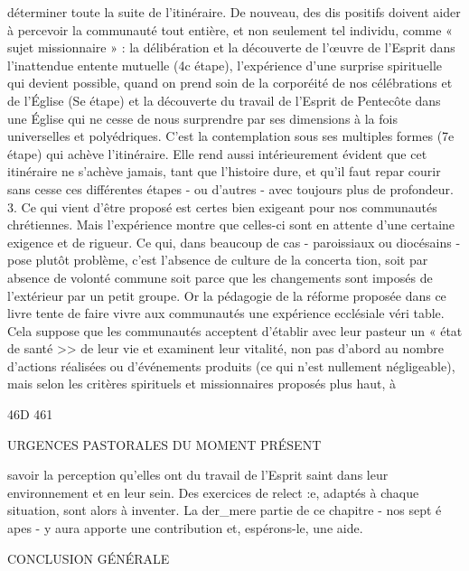{déterminer toute la suite de l'itinéraire. De nouveau, des dis­ positifs doivent aider à percevoir la communauté tout entière, et non seulement tel individu, comme « sujet missionnaire » : la délibération et la découverte de l'œuvre de l'Esprit dans l'inattendue entente mutuelle (4c étape), l'expérience d'une surprise spirituelle qui devient possible, quand on prend soin de la corporéité de nos célébrations et de l'Église (Se étape) et la découverte du travail de l'Esprit de Pentecôte dans une Église qui ne cesse de nous surprendre par ses dimensions à la fois universelles et polyédriques. C'est la contemplation sous ses multiples formes (7e étape) qui achève l'itinéraire. Elle rend aussi intérieurement évident que cet itinéraire ne s'achève jamais, tant que l'histoire dure, et qu'il faut repar­ courir sans cesse ces différentes étapes - ou d'autres - avec toujours plus de profondeur.
3.	Ce qui vient d'être proposé est certes bien exigeant pour nos communautés chrétiennes. Mais l'expérience montre que celles-ci sont en attente d'une certaine exigence et de rigueur. Ce qui, dans beaucoup de cas -	paroissiaux ou diocésains - pose plutôt problème, c'est l'absence de culture de la concerta­ tion, soit par absence de volonté commune soit parce que les changements sont imposés de l'extérieur par un petit groupe. Or la pédagogie de la réforme proposée dans ce livre tente de faire vivre aux communautés une expérience ecclésiale véri­ table. Cela suppose que les communautés acceptent d'établir avec leur pasteur un « état de santé >> de leur vie et examinent leur vitalité, non pas d'abord au nombre d'actions réalisées ou d'événements produits (ce qui n'est nullement négligeable), mais selon les critères spirituels et missionnaires proposés plus haut, à
 

46D	461
 
URGENCES PASTORALES DU MOMENT PRÉSENT
 
savoir la perception qu'elles ont du travail de l'Esprit saint dans leur environnement et en leur sein. Des exercices de relect :e, adaptés à chaque situation, sont alors à inventer. La der_mere partie de ce chapitre - nos sept é apes - y aura apporte une contribution et, espérons-le, une aide.
 





CONCLUSION GÉNÉRALE



}
